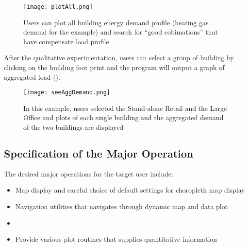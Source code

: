 \begin{enumerate}[1).]
  \begin{figure}[h!]
    \centering
    \texttt{[image: plotAll.png]}
    \caption[See All Demand Plot]{Users can plot all building energy
      demand profile (heating gas demand for the example) and search
      for ``good cobimations'' that have compensate load profile}
    \label{fig:plotAll}
  \end{figure}
  
  After the qualitative experimentation, users can select a group of
  building by clicking on the building foot print and the program will
  output a graph of aggregated load ().

  \begin{figure}[h!]
    \centering
    \texttt{[image: seeAggDemand.png]}
    \caption[Plot Aggregated Demand]{In this example, users selected
      the Stand-alone Retail and the Large Office and plots of each
      single building and the aggregated demand of the two buildings
      are displayed}
    \label{fig:seeAggDemand}
  \end{figure}
  
\end{enumerate}

\subsection{Specification of the Major Operation}
The desired major operations for the target user include: 
\begin{itemize}
\item Map display and careful choice of default settings for
  choropleth map display
\item Navigation utilities that navigates through dynamic map and data
  plot
\item 
\item Provide various plot routines that supplies quantitative
  information
\end{itemize}


